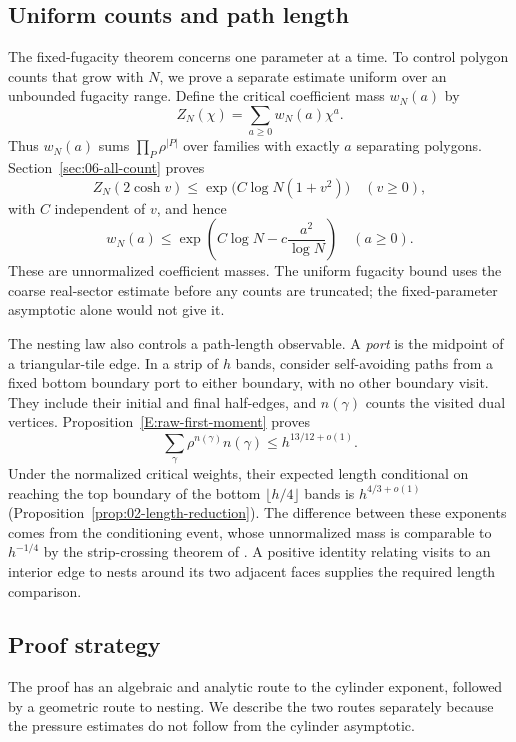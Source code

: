 \subsection{Uniform counts and path length}

The fixed-fugacity theorem concerns one parameter at a time. To control
polygon counts that grow with $N$, we prove a separate estimate uniform
over an unbounded fugacity range. Define the critical coefficient mass
$w_N(a)$ by
\[
 Z_N(\chi)=\sum_{a\ge0}w_N(a)\chi^a.
\]
Thus $w_N(a)$ sums $\prod_P\rho^{|P|}$ over families with exactly
$a$ separating polygons. Section~\ref{sec:06-all-count} proves
\[
 Z_N(2\cosh v)\le\exp\!\bigl(C\log N(1+v^2)\bigr)
       \quad(v\ge0),
\]
with $C$ independent of $v$, and hence
\[
 w_N(a)\le\exp\!\left(C\log N-c\frac{a^2}{\log N}\right)
       \quad(a\ge0).
\]
These are unnormalized coefficient masses. The uniform fugacity bound
uses the coarse real-sector estimate before any counts are truncated;
the fixed-parameter asymptotic alone would not give it.

The nesting law also controls a path-length observable. A \emph{port}
is the midpoint of a triangular-tile edge. In a strip of $h$ bands,
consider self-avoiding paths from a fixed bottom boundary port to
either boundary, with no other boundary visit. They include their
initial and final half-edges, and $n(\gamma)$ counts the visited dual
vertices. Proposition~\ref{E:raw-first-moment} proves
\[
 \sum_\gamma\rho^{n(\gamma)}n(\gamma)
       \le h^{13/12+o(1)}.
\]
Under the normalized critical weights, their expected length conditional
on reaching the top boundary of the bottom $\lfloor h/4\rfloor$ bands is
$h^{4/3+o(1)}$ (Proposition~\ref{prop:02-length-reduction}).
The difference between these exponents comes from the conditioning
event, whose unnormalized mass is comparable to $h^{-1/4}$ by the
strip-crossing theorem of \cite[Theorem~1.1]{StripCompanion}.
A positive identity relating visits to an interior edge to nests
around its two adjacent faces supplies the required length comparison.

\subsection{Proof strategy}

The proof has an algebraic and analytic route to the cylinder exponent,
followed by a geometric route to nesting. We describe the two routes
separately because the pressure estimates do not follow from the
cylinder asymptotic.

